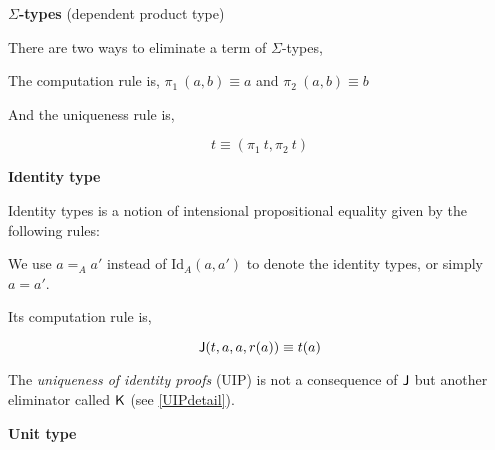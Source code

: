 \textbf{$\Sigma$-types} (dependent product type)


\begin{multicols}{2}
\columnbreak
{}
\end{multicols}

There are two ways to eliminate a term of $\Sigma$-types,

\begin{multicols}{2}
\columnbreak
{}
\end{multicols}

The computation rule is, $\pi_1 ~(a,b) \equiv a$ and $\pi_2 ~(a,b) \equiv b$

And the uniqueness rule is,

$$t \equiv (\pi_1 ~t, \pi_2 ~t)$$

\textbf{Identity type}\label{idtypes} 

Identity types is a notion of intensional propositional equality given by the following rules:

\begin{multicols}{2}
\columnbreak
{}
\end{multicols}

We use  $a =_{A} a'$ instead of $\text{Id}_A(a, a')$ to denote the identity types, or simply $a = a'$.


Its computation rule is,

$$\operatorname{\mathsf{J}} (t,a,a,r(a)) \equiv t(a)$$

The \emph{uniqueness of identity proofs} (UIP) is not a consequence of $\operatorname{\mathsf{J}}$ but another eliminator called $\operatorname{\mathsf{K}}$ (see \autoref{UIPdetail}).


\textbf{Unit type}


\begin{multicols}{2}
\columnbreak
{}
\end{multicols}


